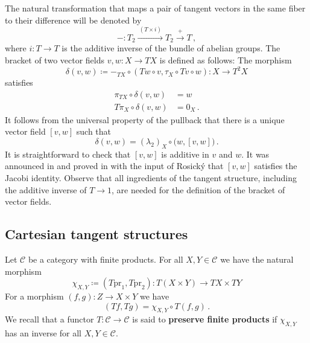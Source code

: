 \documentclass[12pt,reqno, a4paper]{amsart}
\numberwithin{equation}{section}
\theoremstyle{plain}
\theoremstyle{definition}
\theoremstyle{remark}
\newcommand{\calC}{\mathcal{C}}
\newcommand{\Id}{\mathrm{1}}
\newcommand{\pr}{\mathrm{pr}}
\begin{document}
The natural transformation that maps a pair of tangent vectors in the same fiber to their difference will be denoted by
\begin{equation}
\label{eq:Difference}
  -: T_2 \xrightarrow{~(T \times i)~}
  T_2 \xrightarrow{~+~} T
  \,,
\end{equation}
where $i: T \to T$ is the additive inverse of the bundle of abelian groups. The bracket of two vector fields $v,w: X \to TX$ is defined as follows: The morphism
\begin{equation}
\label{eq:DeltaOrig}
  \delta(v,w)
  \coloneqq
  -_{TX} \circ
  (Tw \circ v, \tau_X \circ Tv \circ w): X \longrightarrow T^2X
\end{equation}
satisfies
\begin{equation}
\label{eq:DeltaKerOrig}
\begin{aligned}
  \pi_{TX} \circ \delta(v,w) &= w
  \\
  T\pi_X \circ \delta(v,w) &= 0_X
  \,.
\end{aligned}
\end{equation}
It follows from the universal property of the pullback that there is a unique vector field $[v,w]$ such that
\begin{equation}
\label{eq:deltaBracketRel}
  \delta(v,w) = (\lambda_2)_X \circ \bigl(w, [v,w] \bigr)
  \,.
\end{equation}
It is straightforward to check that $[v,w]$ is additive in $v$ and $w$. It was announced in \cite{Rosicky:1984} and proved in \cite{CockettCruttwell:2015} with the input of Rosick\'y that $[v,w]$ satisfies the Jacobi identity. Observe that all ingredients of the tangent structure, including the additive inverse of $T \to \Id$, are needed for the definition of the bracket of vector fields.



\subsection{Cartesian tangent structures}
\label{sec:CartesianTangent}

Let $\calC$ be a category with finite products. For all $X, Y \in \calC$ we have the natural morphism
\begin{equation}
\label{eq:chiXY}
  \chi_{X,Y} \coloneqq (T\pr_1, T\pr_2): T(X \times Y)
  \longrightarrow TX \times TY
\end{equation}
For a morphism $(f,g): Z \to X \times Y$ we have
\begin{equation}
\label{eq:chifg}
   (Tf,Tg) = \chi_{X,Y} \circ T(f, g)
   \,.
\end{equation}
We recall that a functor $T: \calC \to \calC$ is said to \textbf{preserve finite products} if $\chi_{X,Y}$ has an inverse for all $X,Y \in\calC$.
\end{document}
